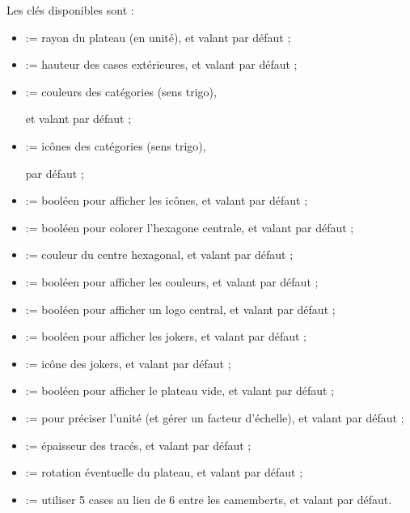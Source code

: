 \documentclass[11pt,a4paper]{ltxdoc}
\begin{document}
Les \textsf{clés} disponibles sont :

\begin{itemize}
	\item {} := rayon du plateau (en unité), et valant  par défaut ;
	\item {} := hauteur des cases extérieures, et valant  par défaut ;
	\item {} := couleurs des catégories (sens trigo),
	
	\hfill{}et valant  par défaut ;
	\item {} := icônes des catégories (sens trigo),
	
	\hfill{} par défaut ;
	\item {} := booléen pour afficher les icônes, et valant  par défaut ;
	\item {} := booléen pour colorer l'hexagone centrale, et valant  par défaut ;
	\item {} := couleur du centre hexagonal, et valant  par défaut ;
	\item {} := booléen pour afficher les couleurs, et valant  par défaut ;
	\item {} := booléen pour afficher un logo central, et valant  par défaut ;
	\item {} := booléen pour afficher les jokers, et valant  par défaut ;
	\item {} := icône des jokers, et valant  par défaut ;
	\item {} := booléen pour afficher le plateau vide, et valant  par défaut ;
	\item {} := pour préciser l'unité (et gérer un facteur d'échelle), et valant  par défaut ;
	\item {} := épaisseur des tracés, et valant \MontreCode{0.8pt} par défaut ;
	\item {} := rotation éventuelle du plateau, et valant  par défaut ;
	\item {} := utiliser 5 cases au lieu de 6 entre les camemberts, et valant  par défaut.
\end{itemize}
\end{document}
